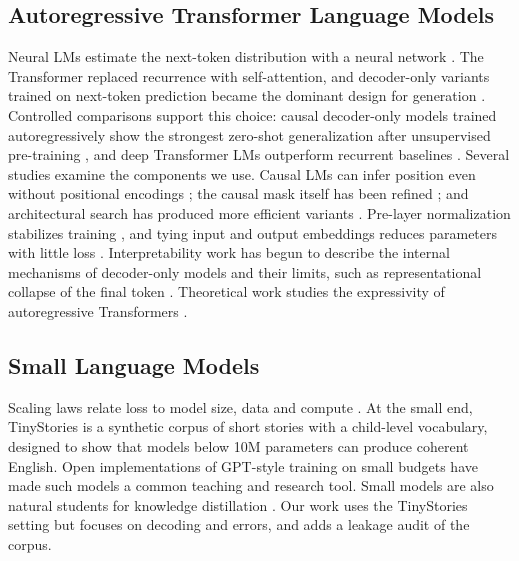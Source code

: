 \documentclass[journal]{IEEEtran}
\begin{document}
\subsection{Autoregressive Transformer Language Models}
Neural LMs estimate the next-token distribution with a neural network \cite{bengio2003neural}. The Transformer \cite{vaswani2017attention} replaced recurrence with self-attention, and decoder-only variants trained on next-token prediction became the dominant design for generation \cite{radford2018gpt,radford2019gpt2,brown2020gpt3,zhang2022opt,scao2022bloom}. Controlled comparisons support this choice: causal decoder-only models trained autoregressively show the strongest zero-shot generalization after unsupervised pre-training \cite{wang2022architecture}, and deep Transformer LMs outperform recurrent baselines \cite{irie2019deep}. Several studies examine the components we use. Causal LMs can infer position even without positional encodings \cite{haviv2022nopos}; the causal mask itself has been refined \cite{yin2024stablemask}; and architectural search has produced more efficient variants \cite{so2021primer}. Pre-layer normalization stabilizes training \cite{xiong2020layer}, and tying input and output embeddings reduces parameters with little loss \cite{press2017tying}. Interpretability work has begun to describe the internal mechanisms of decoder-only models \cite{ferrando2024primer,hanna2024incremental} and their limits, such as representational collapse of the final token \cite{barbero2024glasses}. Theoretical work studies the expressivity of autoregressive Transformers \cite{schuurmans2024universal,yang2025probability}.

\subsection{Small Language Models}
Scaling laws relate loss to model size, data and compute \cite{kaplan2020scaling}. At the small end, TinyStories \cite{eldan2023tinystories} is a synthetic corpus of short stories with a child-level vocabulary, designed to show that models below 10M parameters can produce coherent English. Open implementations of GPT-style training on small budgets \cite{karpathy2022nanogpt} have made such models a common teaching and research tool. Small models are also natural students for knowledge distillation \cite{hinton2015distilling}. Our work uses the TinyStories setting but focuses on decoding and errors, and adds a leakage audit of the corpus.
\end{document}
